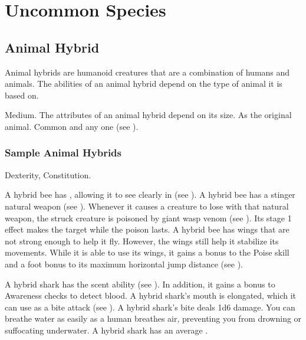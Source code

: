 \chapter{Uncommon Species}\label{Uncommon Species}

\section{Animal Hybrid}
  Animal hybrids are humanoid creatures that are a combination of humans and animals.
  The abilities of an animal hybrid depend on the type of animal it is based on.

   Medium.
   The attributes of an animal hybrid depend on its size.
   As the original animal.
   Common and any one  (see ).

  \subsection{Sample Animal Hybrids}


      Dexterity,  Constitution.
    \begin{raggeditemize}
       A hybrid bee has , allowing it to see clearly in  (see ).
       A hybrid bee has a stinger natural weapon (see ).
        Whenever it causes a creature to lose  with that natural weapon, the struck creature is poisoned by giant wasp venom (see ).
        Its stage 1 effect makes the target \slowed while the poison lasts.
       A hybrid bee has wings that are not strong enough to help it fly.
        However, the wings still help it stabilize its movements.
        While it is able to use its wings, it gains a  bonus to the Poise skill and a  foot bonus to its maximum horizontal jump distance (see ).
    \end{raggeditemize}


    \begin{raggeditemize}
       A hybrid shark has the scent ability (see ).
        In addition, it gains a  bonus to Awareness checks to detect blood.
       A hybrid shark's mouth is elongated, which it can use as a bite attack (see ).
        A hybrid shark's bite deals 1d6 damage.
       You can breathe water as easily as a human breathes air, preventing you from drowning or suffocating underwater.
       A hybrid shark has an average .
    \end{raggeditemize}

